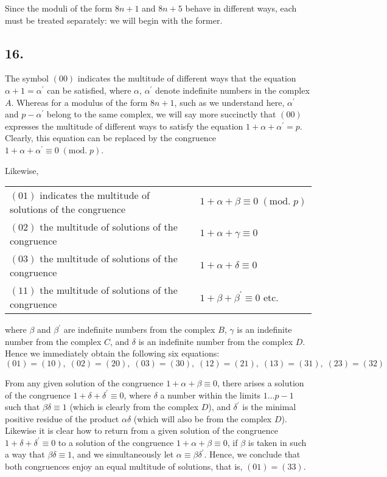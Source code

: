 \documentclass[twoside,12pt]{memoir}
\renewcommand{\pmod}[1]{\;(\textrm{mod.}\;#1)}
\begin{document}
Since the moduli of the form \(8n+1\) and \(8n+5\) behave in different ways, each must be treated separately: we will begin with the former.

\subsection*{16.}
 
The symbol \((00)\) indicates the multitude of different ways that the equation \(\alpha+1=\alpha^{\prime}\) can be satisfied, where \(\alpha\), \(\alpha^{\prime}\) denote indefinite numbers in the complex \(A\). Whereas for a modulus of the form \(8n+1\), such as we understand here, \(\alpha^{\prime}\) and \(p-\alpha^{\prime}\) belong to the same complex, we will say more succinctly that \((00)\) expresses the multitude of different ways to satisfy the equation \(1+\alpha+\alpha^{\prime}=p\).  Clearly, this equation can be replaced by the congruence \(1+\alpha+\alpha^{\prime} \equiv 0 \pmod{p}\).

Likewise,
\begin{center}
\begin{tabular}{ll}
\((01)\) indicates the multitude of solutions of the congruence & \(1+\alpha+\beta \equiv 0\pmod{p}\) \\
\((02)\) the multitude of solutions of the congruence& \(1+\alpha+\gamma \equiv 0\) \\
\((03)\) the multitude of solutions of the congruence& \(1+\alpha+\delta \equiv 0\) \\
\((11)\) the multitude of solutions of the congruence& \(1+\beta+\beta^{\prime} \equiv 0\) etc{.} \\
\end{tabular}
\end{center}
where \(\beta\) and \(\beta^{\prime}\) are indefinite numbers from the complex \(B\), \(\gamma\) is an indefinite number from the complex \(C\), and \(\delta\) is an indefinite number from the complex \(D\). Hence we immediately obtain the following six equations:
\[(01)=(10), \; (02)=(20), \; (03)=(30), \; (12)=(21), \;(13)=(31), \;(23)=(32)\]

From any given solution of the congruence \(1+\alpha+\beta \equiv 0\), there arises a solution of the congruence \(1+\delta+\delta^{\prime} \equiv 0\), where \(\delta\) a number within the limits \(1 \ldots p-1\) \pagebreak%
such that \(\beta \delta \equiv 1\) (which is clearly from the complex \(D\)), and \(\delta^{\prime}\) is the minimal positive residue of the product \(\alpha \delta\) (which will also be from the complex \(D\)). Likewise it is clear how to return from a given solution of the congruence \(1+\delta+\delta^{\prime} \equiv 0\) to a solution of the congruence \(1+\alpha+\beta \equiv 0\), if \(\beta\) is taken in such a way that \(\beta \delta \equiv 1\), and we simultaneously let \(\alpha \equiv \beta \delta^{\prime}\). Hence, we conclude that both congruences enjoy an equal multitude of solutions, that is, \((01) = (33)\).
\end{document}
